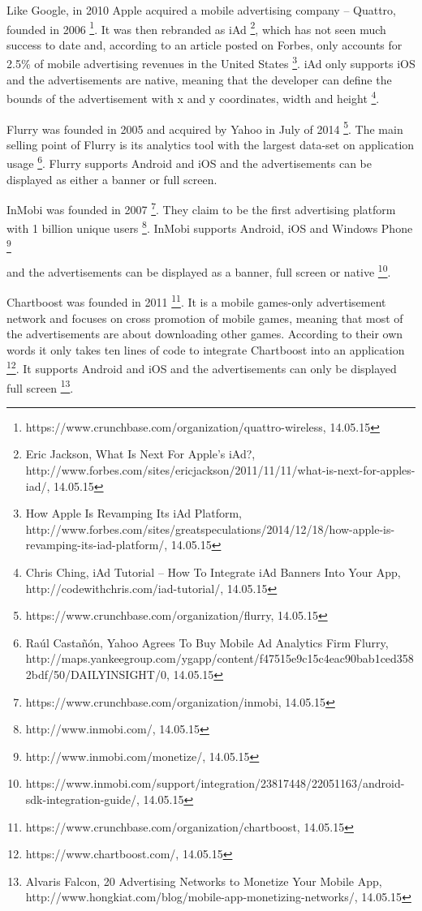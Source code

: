 Like Google, in 2010 Apple acquired a mobile advertising company -- Quattro, founded in 2006 \footnote[14]{https://www.crunchbase.com/organization/quattro-wireless, 14.05.15}. It was then rebranded as iAd \footnote[15]{Eric Jackson, What Is Next For Apple's iAd?, http://www.forbes.com/sites/ericjackson/2011/11/11/what-is-next-for-apples-iad/, 14.05.15}, which has not seen much success to date and, according to an article posted on Forbes, only accounts for 2.5\% of mobile advertising revenues in the United States \footnote[16]{How Apple Is Revamping Its iAd Platform, http://www.forbes.com/sites/greatspeculations/2014/12/18/how-apple-is-revamping-its-iad-platform/, 14.05.15}. iAd only supports iOS and the advertisements are native, meaning that the developer can define the bounds of the advertisement with x and y coordinates, width and height \footnote[17]{Chris Ching, iAd Tutorial – How To Integrate iAd Banners Into Your App, http://codewithchris.com/iad-tutorial/, 14.05.15}.

Flurry was founded in 2005 and acquired by Yahoo in July of 2014 \footnote[18]{https://www.crunchbase.com/organization/flurry, 14.05.15}. The main selling point of Flurry is its analytics tool with the largest data-set on application usage \footnote[19]{Raúl Castañón, Yahoo Agrees To Buy Mobile Ad Analytics Firm Flurry, http://maps.yankeegroup.com/ygapp/content/f47515e9c15c4eac90bab1ced3582bdf/50/DAILYINSIGHT/0, 14.05.15}. Flurry supports Android and iOS and the advertisements can be displayed as either a banner or full screen.

InMobi was founded in 2007 \footnote[20]{https://www.crunchbase.com/organization/inmobi, 14.05.15}. They claim to be the first advertising platform with 1 billion unique users \footnote[21]{http://www.inmobi.com/, 14.05.15}. InMobi supports Android, iOS and Windows Phone \footnote[22]{http://www.inmobi.com/monetize/, 14.05.15}

\newpage

and the advertisements can be displayed as a banner, full screen or native \footnote[23]{https://www.inmobi.com/support/integration/23817448/22051163/android-sdk-integration-guide/, 14.05.15}.

Chartboost was founded in 2011 \footnote[24]{https://www.crunchbase.com/organization/chartboost, 14.05.15}. It is a mobile games-only advertisement network and focuses on cross promotion of mobile games, meaning that most of the advertisements are about downloading other games. According to their own words it only takes ten lines of code to integrate Chartboost into an application \footnote[25]{https://www.chartboost.com/, 14.05.15}. It supports Android and iOS and the advertisements can only be displayed full screen \footnote[26]{Alvaris Falcon, 20 Advertising Networks to Monetize Your Mobile App, http://www.hongkiat.com/blog/mobile-app-monetizing-networks/, 14.05.15}.

